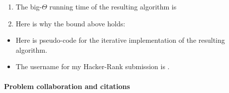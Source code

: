 \newpage

\begin{enumerate}

\item[(d)] %

  The big-$\Theta$ running time of the resulting algorithm is 

\item[(e)] %

  Here is why the bound above holds:

  \begin{blue}
    \REPLACEME
  \end{blue}
  
\end{enumerate}

\begin{itemize}
  
\item[(f)] %
  Here is pseudo-code for the iterative implementation of the resulting algorithm.
  
  \begin{blue}
    \REPLACEME
  \end{blue}
  
\item[(g)]

  The username for my Hacker-Rank submission is \BLUE{
    \REPLACEME
  }.

  
\end{itemize}


\vfill

\paragraph{Problem  collaboration and citations}~

